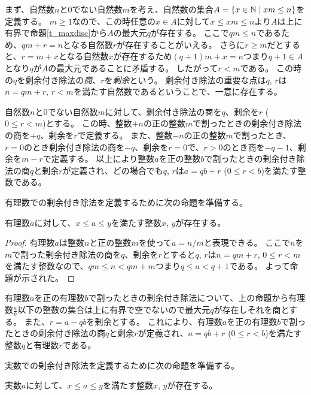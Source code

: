 まず、自然数$n$と$0$でない自然数$m$を考え、自然数の集合$A = \{ x \in \mathbb{N} \mid x m \le n \}$を定義する。
$m \ge 1$なので、この時任意の$x \in A$に対して$x \le x m \le n$より$A$は上に有界で命題\ref{t_maxdisc}から$A$の最大元$q$が存在する。
ここで$q m \le n$であるため、$q m+r = n$となる自然数$r$が存在することがいえる。
さらに$r \ge m$だとすると、$r = m+x$となる自然数$x$が存在するため$(q+1) m+x = n$つまり$q+1 \in A$となり$q$が$A$の最大元であることに矛盾する。
したがって$r < m$である。
この時の$q$を剰余付き除法の\emph{商}、$r$を\emph{剰余}という。
剰余付き除法の重要な点は$q$, $r$は$n = q m+r$, $r < m$を満たす自然数であるということで、一意に存在する。

自然数$n$と$0$でない自然数$m$に対して、剰余付き除法の商を$q$、剰余を$r$ ($0 \le r < m$)とする。
この時、整数$+n$の正の整数$m$で割ったときの剰余付き除法の商を$+q$、剰余を$r$で定義する。
また、整数$-n$の正の整数$m$で割ったとき、$r = 0$のとき剰余付き除法の商を$-q$、剰余を$r = 0$で、$r > 0$のとき商を$-q-1$、剰余を$m-r$で定義する。
以上により整数$a$を正の整数$b$で割ったときの剰余付き除法の商$q$と剰余$r$が定義され、どの場合でも$q$, $r$は$a = q b+r$ ($0 \le r < b$)を満たす整数である。

有理数での剰余付き除法を定義するために次の命題を準備する。

\begin{proposition}
\label{t_int_rational}
有理数$a$に対して、$x \le a \le y$を満たす整数$x$, $y$が存在する。
\end{proposition}

\begin{proof}
有理数$a$は整数$n$と正の整数$m$を使って$a = n/m$と表現できる。
ここで$n$を$m$で割った剰余付き除法の商を$q$、剰余を$r$とすると$q$, $r$は$n = q m+r$, $0 \le r < m$を満たす整数なので、$q m \le n < q m+m$つまり$q \le a < q+1$である。
よって命題が示された。
\end{proof}

有理数$a$を正の有理数$b$で割ったときの剰余付き除法について、上の命題から有理数$\frac{a}{b}$以下の整数の集合は上に有界で空でないので最大元$q$が存在しそれを商とする。
また、$r = a-q b$を剰余とする。
これにより、有理数$a$を正の有理数$b$で割ったときの剰余付き除法の商$q$と剰余$r$が定義され、$a = q b+r$ ($0 \le r < b$)を満たす整数$q$と有理数$r$である。

実数での剰余付き除法を定義するために次の命題を準備する。

\begin{proposition}
\label{t_int_real}
実数$a$に対して、$x \le a \le y$を満たす整数$x$, $y$が存在する。
\end{proposition}

